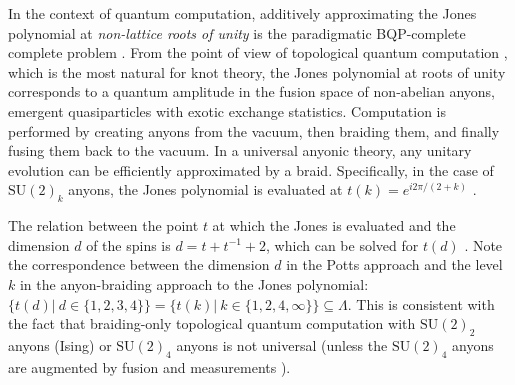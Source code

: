In the context of quantum computation,
additively approximating the Jones polynomial at \emph{non-lattice roots of unity} is the paradigmatic BQP-complete complete problem \cite{Aharonov_2008,kuperberg2014hard}.
From the point of view
of topological quantum computation \cite{pachos_2012}, which is the most natural for knot theory, 
the Jones polynomial at roots of unity corresponds to a quantum amplitude in the fusion space of non-abelian anyons, emergent quasiparticles with exotic exchange statistics.
Computation is performed by creating anyons from the vacuum, then braiding them, and finally fusing them back to the vacuum.
In a universal anyonic theory, any unitary evolution can be efficiently approximated by a braid.
Specifically, in the case of $\text{SU}(2)_k$ anyons, the Jones polynomial is evaluated at $t(k) = e^{i 2\pi/(2+k)}$ \cite{Witten1989,Rowell_2018}.

The relation between the point $t$ at which the Jones is evaluated and the dimension $d$ of the spins is $d = t + t^{-1} +2$,
which can be solved for $t(d)$ \cite{PhysRevE.100.033303}.
Note the correspondence between the dimension $d$ in the Potts approach and the level $k$ in the anyon-braiding approach to the Jones polynomial: $\{t(d) | ~ d \in\{1,2,3,4\} \} = \{ t(k) | ~ k\in\{1,2,4,\infty\} \} \subseteq \Lambda$.
This is consistent with the fact that braiding-only topological quantum computation with $\text{SU}(2)_2$ anyons (Ising) or $\text{SU}(2)_4$ anyons is not universal (unless the $\text{SU}(2)_4$ anyons are augmented by fusion and measurements \cite{Levaillant_2015}).

